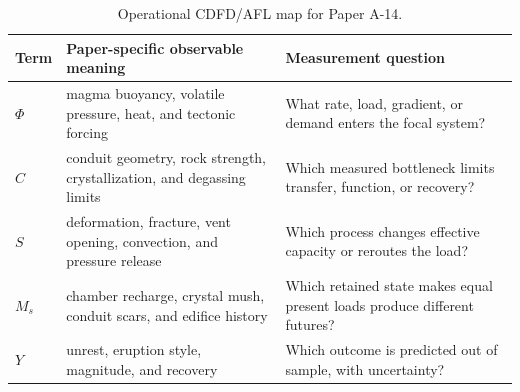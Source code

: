 \documentclass[11pt,a4paper]{article}
\begin{document}
\begin{table}[htbp]
\centering
\small
\caption{Operational CDFD/AFL map for Paper A-14.}
\begin{tabularx}{\textwidth}{|l|X|X|}
\hline
\textbf{Term} & \textbf{Paper-specific observable meaning} & \textbf{Measurement question} \\
\hline
$\Phi$ & magma buoyancy, volatile pressure, heat, and tectonic forcing & What rate, load, gradient, or demand enters the focal system? \\
\hline
$C$ & conduit geometry, rock strength, crystallization, and degassing limits & Which measured bottleneck limits transfer, function, or recovery? \\
\hline
$S$ & deformation, fracture, vent opening, convection, and pressure release & Which process changes effective capacity or reroutes the load? \\
\hline
$M_s$ & chamber recharge, crystal mush, conduit scars, and edifice history & Which retained state makes equal present loads produce different futures? \\
\hline
$Y$ & unrest, eruption style, magnitude, and recovery & Which outcome is predicted out of sample, with uncertainty? \\
\hline
\end{tabularx}
\end{table}
\end{document}
